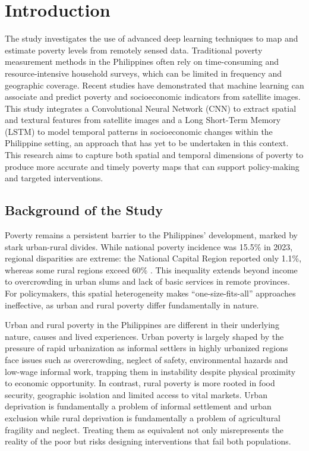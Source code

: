 \documentclass[12pt, letterpaper]{article}
\numberwithin{figure}{section}
\numberwithin{table}{section}
\begin{document}
\newpage


\section{Introduction}
The study investigates the use of advanced deep learning
techniques to map and estimate poverty levels from remotely sensed
data. Traditional poverty measurement methods in the Philippines
often rely on time-consuming and resource-intensive household
surveys, which can be limited in frequency and geographic coverage.
Recent studies have demonstrated that machine learning can associate
and predict poverty and socioeconomic indicators from satellite
images. This study integrates a Convolutional Neural Network (CNN) to
extract spatial and textural features from satellite images and a
Long Short-Term Memory (LSTM) to model temporal patterns in
socioeconomic changes within the Philippine setting, an approach that
has yet to be undertaken in this
context. This research aims to capture both spatial and temporal
dimensions of poverty to produce more accurate and timely poverty
maps that can support policy-making and targeted interventions.

\subsection{Background of the Study}
Poverty remains a persistent barrier to the Philippines' development,
marked by stark urban-rural divides. While national poverty incidence
was 15.5\% in 2023, regional disparities are extreme: the National
Capital Region reported only 1.1\%, whereas some rural regions exceed
60\% \parencite{Onsay2024}. This inequality extends beyond income to
overcrowding in urban slums and lack of basic services in remote
provinces. For policymakers, this spatial heterogeneity makes
“one-size-fits-all” approaches ineffective, as urban and rural
poverty differ fundamentally in nature.

Urban and rural poverty in the Philippines are different in their
underlying nature, causes and lived experiences. Urban poverty is
largely shaped by the pressure of rapid urbanization as informal
settlers in highly urbanized regions face issues such as
overcrowding, neglect of safety, environmental hazards and low-wage
informal work, trapping them in instability despite physical
proximity to economic opportunity. \parencite{WBG2017} In contrast,
rural poverty is more rooted in food security, geographic isolation
and limited access to vital markets. Urban deprivation is
fundamentally a problem of informal settlement and urban exclusion
while rural deprivation is fundamentally a problem of agricultural
fragility and neglect. \parencite{Jayaweera2023} Treating them as
equivalent not only misrepresents the reality of the poor but risks
designing interventions that fail both populations.
\end{document}
